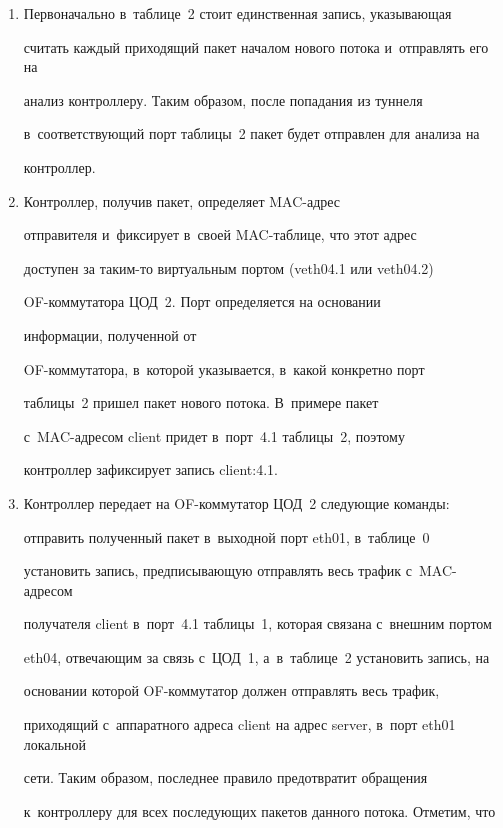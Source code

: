 \begin{enumerate}
декапсулированный GRE-трафик на обработку в~таблицу с~номером~2.


\item Первоначально в~таблице~2 стоит единственная запись, указывающая 


считать каждый приходящий пакет началом нового потока и~отправлять его на 


анализ контроллеру. Таким образом, после попадания из туннеля 


в~соответствующий порт таб\-ли\-цы~2 пакет будет отправлен для анализа на 


контроллер.


      \item Контроллер, получив пакет, определяет MAC-ад\-рес 


отправителя и~фиксирует в~своей MAC-таб\-ли\-це, что этот адрес 


доступен за таким-то виртуальным портом (veth04.1 или veth04.2)  


OF-ком\-му\-та\-то\-ра ЦОД~2. Порт определяется на основании 


информации, полученной от  


OF-ком\-му\-та\-то\-ра, в~которой указывается, в~какой конкретно порт 


таб\-ли\-цы~2 пришел пакет нового потока. В~примере пакет  


с~MAC-ад\-ре\-сом client придет в~порт~4.1 таб\-ли\-цы~2, поэтому 


контроллер зафиксирует запись client:4.1.


\item Контроллер передает на OF-ком\-му\-та\-тор ЦОД~2 следующие команды: 


отправить полученный пакет в~выходной порт eth01, в~таб\-ли\-це~0 


установить запись, предписывающую отправлять весь трафик с~MAC-адресом 


получателя client в~порт~4.1 таблицы~1, которая связана с~внешним портом 


eth04, отвечающим за связь с~ЦОД~1, а~в~таб\-ли\-це~2 установить запись, на 


основании которой OF-ком\-му\-та\-тор должен отправлять весь трафик, 


приходящий с~аппаратного адреса client на адрес server, в~порт eth01 локальной 


сети. Таким образом, последнее правило предотвратит обращения 


к~контроллеру для всех последующих пакетов данного потока. Отметим, что 



\end{enumerate}
